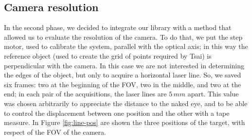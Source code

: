 \subsection{Camera resolution}
In the second phase, we decided to integrate our library with a method that allowed us to evaluate the resolution of the camera. To do that, we put the step motor, used to calibrate the system, parallel with the optical axis; in this way the reference object (used to create the grid of points required by Tsai) is perpendicular with the camera. In this case we are not interested in determining the edges of the object, but only to acquire a horizontal laser line. So, we saved six frames: two at the beginning of the \acs{FOV}, two in the middle, and two at the end; in each pair of the acquisitions, the laser lines are $5 \, mm$ apart. This value was chosen arbitrarily to appreciate the distance to the naked eye, and to be able to control the displacement between one position and the other with a tape measure. In Figure \ref{fig:line-pos} are shown the three positions of the target, with respect of the \acs{FOV} of the camera.
